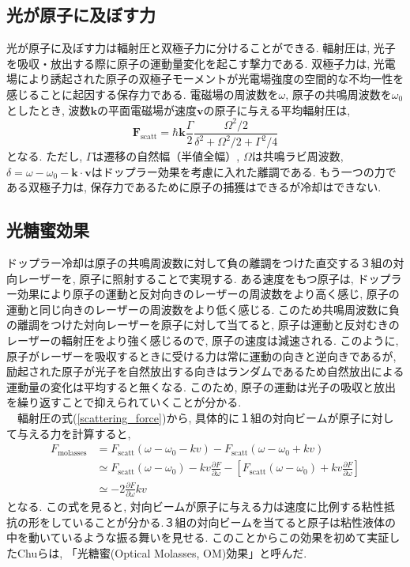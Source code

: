 \documentclass[uplatex, dvipdfmx, a4paper, report, papersize, 11pt]{jsbook}
\begin{document}
\subsection{光が原子に及ぼす力}
 光が原子に及ぼす力は輻射圧と双極子力に分けることができる. 輻射圧は, 光子を吸収・放出する際に原子の運動量変化を起こす撃力である\cite{ノーベル賞と分光学}. 双極子力は, 光電場により誘起された原子の双極子モーメントが光電場強度の空間的な不均一性を感じることに起因する保存力である\cite{気体原子のレーザー冷却}.
 電磁場の周波数を$\omega$, 原子の共鳴周波数を$\omega_0$としたとき, 波数$\bm k$の平面電磁場が速度$\bm v$の原子に与える平均輻射圧は,
 \begin{equation}\label{scattering_force}
\bm{F} _ { \mathrm { scatt } } = \hbar \bm{k}\frac { \Gamma } { 2 } \frac { \Omega ^ { 2 } / 2 } { \delta ^ { 2 } + \Omega ^ { 2 } / 2 + \Gamma ^ { 2 } / 4 }
 \end{equation}
となる\cite{Foot:1080846}. ただし, $\Gamma$は遷移の自然幅（半値全幅）, $\Omega$は共鳴ラビ周波数, $\delta = \omega - \omega _ { 0 } - \bm{k} \cdot \bm{v}$はドップラー効果を考慮に入れた離調である. もう一つの力である双極子力は, 保存力であるために原子の捕獲はできるが冷却はできない\cite{ノーベル賞と分光学}.

\subsection{光糖蜜効果}
ドップラー冷却は原子の共鳴周波数に対して負の離調をつけた直交する３組の対向レーザーを, 原子に照射することで実現する. ある速度をもつ原子は, ドップラー効果により原子の運動と反対向きのレーザーの周波数をより高く感じ, 原子の運動と同じ向きのレーザーの周波数をより低く感じる. このため共鳴周波数に負の離調をつけた対向レーザーを原子に対して当てると, 原子は運動と反対むきのレーザーの輻射圧をより強く感じるので, 原子の速度は減速される. このように, 原子がレーザーを吸収するときに受ける力は常に運動の向きと逆向きであるが, 励起された原子が光子を自然放出する向きはランダムであるため自然放出による運動量の変化は平均すると無くなる. このため, 原子の運動は光子の吸収と放出を繰り返すことで抑えられていくことが分かる.\\
　輻射圧の式(\ref{scattering_force})から, 具体的に１組の対向ビームが原子に対して与える力を計算すると,
\begin{equation}
  \begin{split}
    F _ { \mathrm{molasses} } &= F _ { \mathrm{scatt}  } \left( \omega - \omega _ { 0 } - k v \right) - F _ {  \mathrm{scatt} }  \left( \omega - \omega _ { 0 } + k v \right)
    \\& \simeq F _ { \mathrm{scatt}  } \left( \omega - \omega _ { 0 } \right) - k v \frac { \partial F } { \partial \omega } - \left[ F _ {  \mathrm{scatt} } \left( \omega - \omega _ { 0 } \right) + k v \frac { \partial F } { \partial \omega } \right]
    \\& \simeq - 2 \frac { \partial F } { \partial \omega } k v
  \end{split}
\end{equation}
となる. この式を見ると, 対向ビームが原子に与える力は速度に比例する粘性抵抗の形をしていることが分かる.３組の対向ビームを当てると原子は粘性液体の中を動いているような振る舞いを見せる. このことからこの効果を初めて実証したChuらは, 「光糖蜜(Optical Molasses,  OM)効果」と呼んだ.
\end{document}
